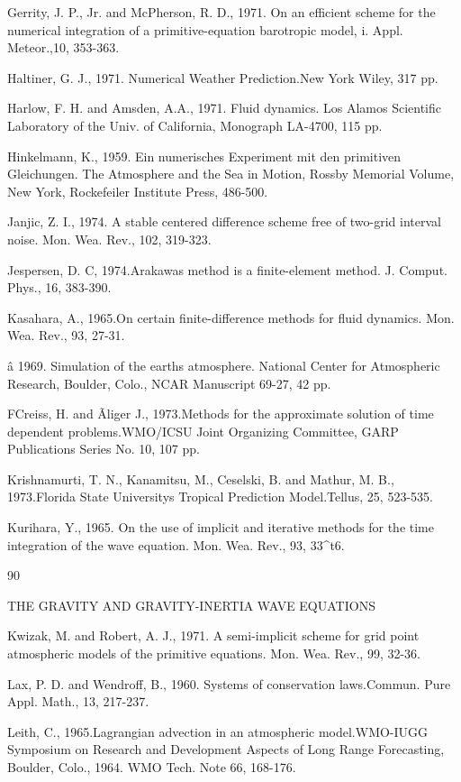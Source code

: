 Gerrity, J. P., Jr. and McPherson, R. D., 1971. On an efficient scheme
for the numerical integration of a primitive-equation barotropic model,
i. Appl. Meteor.,10, 353-363.

Haltiner, G. J., 1971. Numerical Weather Prediction.New York Wiley, 317
pp.

Harlow, F. H. and Amsden, A.A., 1971. Fluid dynamics. Los Alamos
Scientific Laboratory of the Univ. of California, Monograph LA-4700,
115 pp.

Hinkelmann, K., 1959. Ein numerisches Experiment mit den primitiven
Gleichungen. The Atmosphere and the Sea in Motion, Rossby Memorial
Volume, New York, Rockefeiler Institute Press, 486-500.

Janjic, Z. I., 1974. A stable centered difference scheme free of
two-grid interval noise. Mon. Wea. Rev., 102, 319-323.

Jespersen, D. C, 1974.Arakawa\textquotesingle s method is a
finite-element method. J. Comput. Phys., 16, 383-390.

Kasahara, A., 1965.On certain finite-difference methods for fluid
dynamics. Mon. Wea. Rev., 93, 27-31.

â 1969. Simulation of the earth\textquotesingle s atmosphere. National
Center for Atmospheric Research, Boulder, Colo., NCAR Manuscript 69-27,
42 pp.

FCreiss, H. and Ãliger J., 1973.Methods for the approximate solution of
time dependent problems.WMO/ICSU Joint Organizing Committee, GARP
Publications Series No. 10, 107 pp.

Krishnamurti, T. N., Kanamitsu, M., Ceselski, B. and Mathur, M. B.,
1973.Florida State University\textquotesingle s Tropical Prediction
Model.Tellus, 25, 523-535.

Kurihara, Y., 1965. On the use of implicit and iterative methods for the
time integration of the wave equation. Mon. Wea. Rev., 93, 33\^{}t6.

90

THE GRAVITY AND GRAVITY-INERTIA WAVE EQUATIONS

Kwizak, M. and Robert, A. J., 1971. A semi-implicit scheme for grid
point atmospheric models of the primitive equations. Mon. Wea. Rev., 99,
32-36.

Lax, P. D. and Wendroff, B., 1960. Systems of conservation laws.Commun.
Pure Appl. Math., 13, 217-237.

Leith, C., 1965.Lagrangian advection in an atmospheric model.WMO-IUGG
Symposium on Research and Development Aspects of Long Range Forecasting,
Boulder, Colo., 1964. WMO Tech. Note 66, 168-176.

